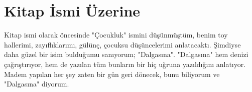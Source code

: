\section{Kitap İsmi Üzerine}

Kitap ismi olarak öncesinde "Çocukluk" ismini düşünmüştüm, benim toy hallerimi, zayıflıklarımı, gülünç, çocuksu düşüncelerimi anlatacaktı. Şimdiyse daha güzel bir isim bulduğumu sanıyorum; "Dalgasına". "Dalgasına" hem denizi çağrıştırıyor, hem de yazılan tüm bunların bir hiç uğruna yazıldığını anlatıyor. Madem yapılan her şey zaten bir gün geri dönecek, bunu biliyorum ve "Dalgasına" diyorum.